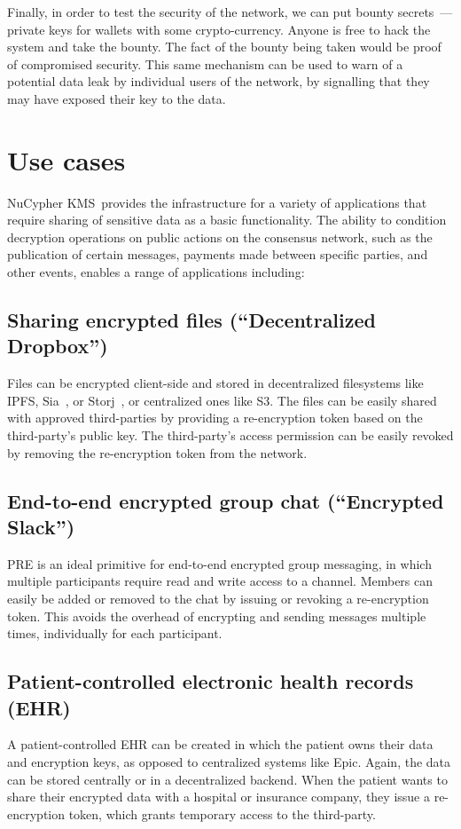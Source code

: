 \documentclass[notitlepage,longbibliography]{revtex4-1}
\newcommand{\kms}{NuCypher KMS}
\begin{document}
Finally, in order to test the security of the network, we can put bounty secrets~--- private keys for wallets with
some crypto-currency.
Anyone is free to hack the system and take the bounty.
The fact of the bounty being taken would be proof of compromised security.
This same mechanism can be used to warn of a potential data leak by individual users of the network, by signalling that they may have exposed
their key to the data.

\section{Use cases}
\kms~provides the infrastructure for a variety of applications that require sharing of sensitive data as a basic
functionality. The ability to condition decryption operations on public actions on the consensus network, such as the publication
of certain messages, payments made between specific parties, and other events, enables a range of applications including:

\subsection{Sharing encrypted files (``Decentralized Dropbox'')}
Files can be encrypted client-side and stored in decentralized filesystems like IPFS, Sia~\cite{web:sia}, or Storj~\cite{web:storj}, or centralized ones like S3.
The files can be easily shared with approved third-parties by providing a re-encryption token based on the third-party's
public key.
The third-party's access permission can be easily revoked by removing the re-encryption token from the network.

\subsection{End-to-end encrypted group chat (``Encrypted Slack'')}
PRE is an ideal primitive for end-to-end encrypted group messaging, in which multiple participants require read and write
access to a channel. Members can easily be added or removed to the chat by issuing or revoking a re-encryption token.
This avoids the overhead of encrypting and sending messages multiple times, individually for each participant.

\subsection{Patient-controlled electronic health records (EHR)}
A patient-controlled EHR can be created in which the patient owns their data and encryption keys, as opposed to centralized
systems like Epic.
Again, the data can be stored centrally or in a decentralized backend.
When the patient wants to share their encrypted data with a hospital or insurance company, they issue a re-encryption token,
which grants temporary access to the third-party.
\end{document}
